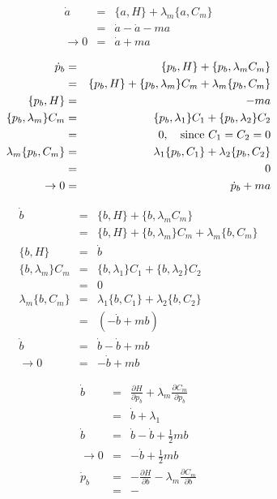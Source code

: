 \documentclass[aps,preprint,preprintnumbers,nofootinbib,showpacs,prd]{revtex4-1}
\newcommand{\nbea}{\begin{eqnarray*}}
\newcommand{\neea}{\end{eqnarray*}}
\begin{document}
%
\nbea
\dot a & = & \{a, H\} + \lambda_m  \{a, C_m\} \\
& = & \dot a - \dot a - ma  \\
\to 0 & = & \dot a + ma
\neea
%

%
\nbea
\dot p_b & = & \{p_b, H\} + \{p_b, \lambda_m C_m\} \\
& = & \{p_b, H\} + \{p_b, \lambda_m\}C_m + \lambda_m\{p_b, C_m\}  \\
\{p_b, H\} & = & - ma \\
\{p_b, \lambda_m\}C_m & = & \{p_b, \lambda_1\}C_1 + \{p_b, \lambda_2\}C_2 \\
& = & 0, ~~~{\rm since~} C_1 = C_2 = 0 \\
\lambda_m\{p_b, C_m\} & = & \lambda_1\{p_b, C_1\} + \lambda_2\{p_b, C_2\} \\
& = & 0 \\
\to 0 & = & \dot p_b + ma
\neea
%

%
\nbea
\dot b & = & \{b, H\} + \{b, \lambda_m C_m\} \\
& = & \{b, H\} + \{b, \lambda_m\}C_m + \lambda_m\{b, C_m\}  \\
\{b, H\} & = & \dot b \\
\{b, \lambda_m\}C_m & = & \{b, \lambda_1\}C_1 + \{b, \lambda_2\}C_2 \\
& = & 0 \\
\lambda_m\{b, C_m\} & = & \lambda_1\{b, C_1\} + \lambda_2\{b, C_2\} \\
& = & (- \dot b + mb) \\
\dot b & = & \dot b - \dot b + mb \\
\to 0 & = & - \dot b + mb
\neea
%



%
\nbea
\dot b & = & \frac{\partial H}{\partial p_b} + \lambda_m \frac{\partial C_m}{\partial p_b} \\
& = & \dot b + \lambda_1 \\
\dot b & = & \dot b - \dot b + \frac{1}{2}mb \\
\to 0 & = & - \dot b + \frac{1}{2}mb  \\
\dot p_b & = & - \frac{\partial H}{\partial b} - \lambda_m \frac{\partial C_m}{\partial b} \\
& = & -
\neea
%
\end{document}
